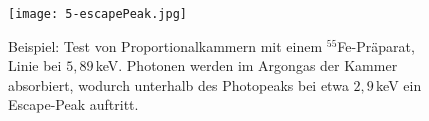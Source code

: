 \begin{figure}[H]
	\centering
	\texttt{[image: 5-escapePeak.jpg]}
	\caption{Beispiel: Test von Proportionalkammern mit einem $^{55}$Fe-Präparat, Linie bei
	$5{,}89\,$keV. Photonen werden im Argongas der Kammer absorbiert, wodurch unterhalb des Photopeaks
	bei etwa $2{,}9\,$keV ein Escape-Peak auftritt.
	}
	\label{escapepeak}
\end{figure}

